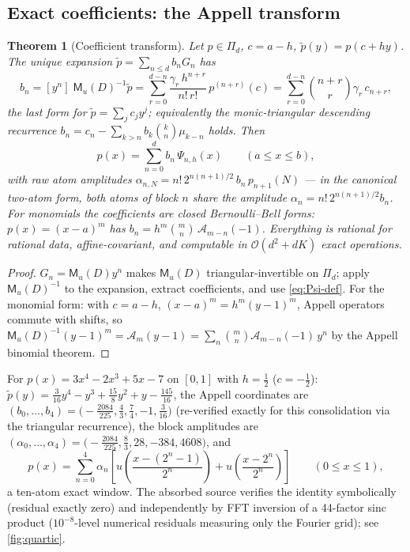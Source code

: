 \documentclass[11pt,oneside]{article}
\numberwithin{equation}{section}
\newtheorem{theorem}{Theorem}[section]
\theoremstyle{definition}
\theoremstyle{remark}
\newcommand{\bigO}{\mathcal O}
\newcommand{\MM}{\mathsf M}
\newcommand{\Gd}{\mathcal A}
\newcommand{\PiD}{\Pi_d}
\begin{document}
\subsection{Exact coefficients: the Appell transform}

\begin{theorem}[Coefficient transform]
\label{thm:coefficient-transform}
Let $p\in\PiD$, $c=a-h$, $\widetilde p(y)=p(c+hy)$.  The unique
expansion $\widetilde p=\sum_{n\le d}b_nG_n$ has
\begin{equation}
 b_n=[y^{n}]\;\MM_u(D)^{-1}\widetilde p
 =\sum_{r=0}^{d-n}\frac{\gamma_r\,h^{n+r}}{n!\,r!}\,
 p^{(n+r)}(c)
 =\sum_{r=0}^{d-n}\binom{n+r}{r}\gamma_r\,c_{n+r},
 \label{eq:b-formulas}
\end{equation}
the last form for $\widetilde p=\sum_jc_jy^{j}$; equivalently the
monic-triangular descending recurrence
$b_n=c_n-\sum_{k>n}b_k\binom kn\mu_{k-n}$ holds.  Then
\begin{equation}
 p(x)=\sum_{n=0}^{d}b_n\,\Psi_{n,h}(x)
 \qquad(a\le x\le b),
 \label{eq:p-Psi}
\end{equation}
with raw atom amplitudes
$\alpha_{n,N}=n!\,2^{n(n+1)/2}\,b_n\,p_{n+1}(N)$ --- in the canonical
two-atom form, both atoms of block $n$ share the amplitude
$\alpha_n=n!\,2^{n(n+1)/2}b_n$.  For monomials the coefficients are
closed Bernoulli--Bell forms: $p(x)=(x-a)^{m}$ has
$b_n=h^{m}\binom mn\,\Gd_{m-n}(-1)$.  Everything is rational for
rational data, affine-covariant, and computable in
$\bigO(d^{2}+dK)$ exact operations.
\end{theorem}

\begin{proof}
$G_n=\MM_u(D)y^{n}$ makes $\MM_u(D)$ triangular-invertible on
$\PiD$; apply $\MM_u(D)^{-1}$ to the expansion, extract coefficients,
and use \eqref{eq:Psi-def}.  For the monomial form: with $c=a-h$,
$(x-a)^{m}=h^{m}(y-1)^{m}$, Appell operators commute with shifts, so
$\MM_u(D)^{-1}(y-1)^{m}=\Gd_m(y-1)
=\sum_n\binom mn\Gd_{m-n}(-1)\,y^{n}$ by the Appell binomial
theorem.
\end{proof}

\begin{example}
For $p(x)=3x^{4}-2x^{3}+5x-7$ on $[0,1]$ with $h=\tfrac12$
($c=-\tfrac12$): $\widetilde p(y)
=\tfrac3{16}y^{4}-y^{3}+\tfrac{15}8y^{2}+y-\tfrac{145}{16}$, the
Appell coordinates are
$(b_0,\dots,b_4)
=\bigl(-\tfrac{2084}{225},\tfrac43,\tfrac74,-1,\tfrac3{16}\bigr)$
(re-verified exactly for this consolidation via the triangular
recurrence), the block amplitudes are
$(\alpha_0,\dots,\alpha_4)
=\bigl(-\tfrac{2084}{225},\tfrac83,28,-384,4608\bigr)$, and
\begin{equation}
 p(x)=\sum_{n=0}^{4}\alpha_n\left[
 u\!\left(\frac{x-(2^{n}-1)}{2^{n}}\right)
 +u\!\left(\frac{x-2^{n}}{2^{n}}\right)\right]
 \qquad(0\le x\le1),
 \label{eq:quartic}
\end{equation}
a ten-atom exact window.  The absorbed source verifies the identity
symbolically (residual exactly zero) and independently by FFT
inversion of a 44-factor sinc product ($10^{-8}$-level numerical
residuals measuring only the Fourier grid); see
\cref{fig:quartic}.
\end{example}
\end{document}
